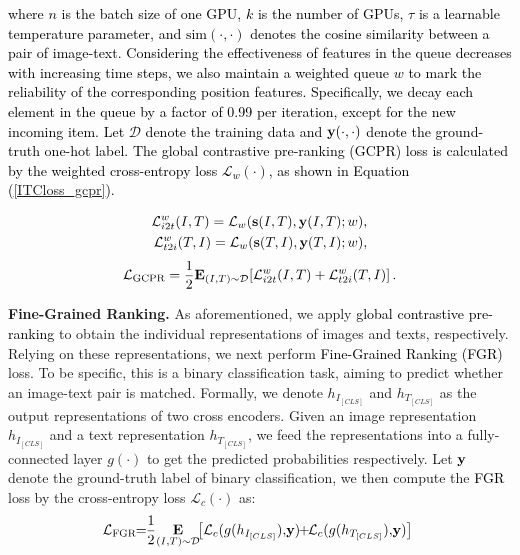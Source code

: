 \documentclass[sigconf]{acmart}
\def\mD{{\mathcal D}}
\def\mL{{\mathcal L}}
\def\bs{{\bf s}}
\def\by{{\bf y}}
\def\mmE{{\textbf E}}
\def\simm{{\mathrm{sim}}}
\def\by{{\bf y}}
\def\ljc{\textcolor{black}}
\def\mmxie{\textcolor{black}}
\def\mmcr{\textcolor{black}}
\begin{document}
\ljc{where $n$ is the batch size of one GPU, $k$ is the number of GPUs, $\tau$ is a learnable temperature parameter, and $\simm(\cdot, \cdot)$ denotes the cosine similarity between a pair of image-text.}
\mmxie{Considering the effectiveness of features in the queue decreases with increasing time steps, we also maintain a weighted queue $w$ to mark the reliability of the corresponding position features. Specifically, we decay each element in the queue by a factor of 0.99 per iteration, except for the new incoming item. Let $\mD$ denote the training data and $\by(\cdot, \cdot)$ denote the ground-truth one-hot label. The \mmcr{global contrastive pre-ranking (GCPR)} loss is calculated by the weighted cross-entropy loss $\mL_w(\cdot)$, as shown in Equation (\ref{ITCloss_gcpr}). }

\begin{equation*}
    \begin{aligned}
        \mL_{i2t}^{w}(I,T)=\mL_w(\bs(I, T), \by(I, T);w), \\
        \mL_{t2i}^{w}(T,I)=\mL_w(\bs(T, I), \by(T, I);w),
    \end{aligned}
\end{equation*}
\begin{equation}
    \begin{aligned}
    \label{ITCloss_gcpr}
    \mL_{\text{GCPR}} = \frac{1}{2}\mmE_{(I,T){\sim} \mD} \!\left [\mL_{i2t}^{w}(I,T) + \mL_{t2i}^{w}(T,I) \right ].
    \end{aligned}
\end{equation}


\textbf{Fine-Grained Ranking.}
As aforementioned, we apply \mmcr{global contrastive pre-ranking} to obtain the individual representations of images and texts, respectively. Relying on these representations, we next perform \mmcr{Fine-Grained Ranking (FGR)} loss. To be specific, this is a binary classification task, aiming to predict whether an image-text pair is matched.
Formally, we denote $h_{I_{[CLS]}}$ and $h_{T_{[CLS]}}$ as the output representations of two cross encoders.
Given an image representation $h_{I_{[CLS]}}$ and a text representation $h_{T_{[CLS]}}$, 
we feed the representations into a fully-connected layer $g(\cdot)$ to get the predicted probabilities respectively. Let $\by$ denote the ground-truth label of binary classification, we then compute the \mmcr{FGR} loss by the cross-entropy loss $\mL_c(\cdot)$ as:
\begin{align}
    \label{FGRloss}
    \!\!\!\mL_{\text{FGR}}\!\!=\!\!\frac{1}{2}\!\mathop{\mmE}_{(I,T){\sim} \mD}\! \!\left [\mL_c(g(h_{I_{[CLS]}}),\!\by)\!\!+\!\!\mL_c(g(h_{T_{[CLS]}}),\! \by)\right ]\!
\end{align}
\end{document}
